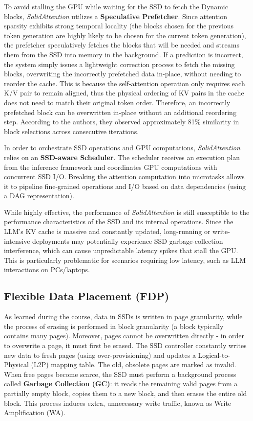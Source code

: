 \documentclass[conference]{IEEEtran}
\begin{document}
        To avoid stalling the GPU while waiting for the SSD to fetch the Dynamic blocks, \textit{SolidAttention}\cite{solidattention} utilizes a \textbf{Speculative Prefetcher}. Since attention sparsity exhibits strong temporal locality (the blocks chosen for the previous token generation are highly likely to be chosen for the current token generation), the prefetcher speculatively fetches the blocks that will be needed and streams them from the SSD into memory in the background. If a prediction is incorrect, the system simply issues a lightweight correction process to fetch the missing blocks, overwriting the incorrectly prefetched data in-place, without needing to reorder the cache. This is because the self-attention operation only requires each K/V pair to remain aligned, thus the physical ordering of KV pairs in the cache does not need to match their original token order. Therefore, an incorrectly prefetched block can be overwritten in-place without an additional reordering step. According to the authors, they observed approximately 81\% similarity in block selections across consecutive iterations.

        In order to orchestrate SSD operations and GPU computations, \textit{SolidAttention}\cite{solidattention} relies on an \textbf{SSD-aware Scheduler}. The scheduler receives an execution plan from the inference framework and coordinates GPU computations with concurrent SSD I/O. Breaking the attention computation into microtasks allows it to pipeline fine-grained operations and I/O based on data dependencies (using a DAG representation).

        While highly effective, the performance of \textit{SolidAttention}\cite{solidattention} is still susceptible to the performance characteristics of the SSD and its internal operations. Since the LLM's KV cache is massive and constantly updated, long-running or write-intensive deployments may potentially experience SSD garbage-collection interference, which can cause unpredictable latency spikes that stall the GPU. This is particularly problematic for scenarios requiring low latency, such as LLM interactions on PCs/laptops.
    
    \subsection{Flexible Data Placement (FDP)}
        As learned during the course, data in SSDs is written in page granularity, while the process of erasing is performed in block granularity (a block typically contains many pages). Moreover, pages cannot be overwritten directly - in order to overwrite a page, it must first be erased. The SSD controller constantly writes new data to fresh pages (using over-provisioning) and updates a Logical-to-Physical (L2P) mapping table. The old, obsolete pages are marked as invalid. When free pages become scarce, the SSD must perform a background process called \textbf{Garbage Collection (GC)}: it reads the remaining valid pages from a partially empty block, copies them to a new block, and then erases the entire old block. This process induces extra, unnecessary write traffic, known as Write Amplification (WA).
\end{document}
